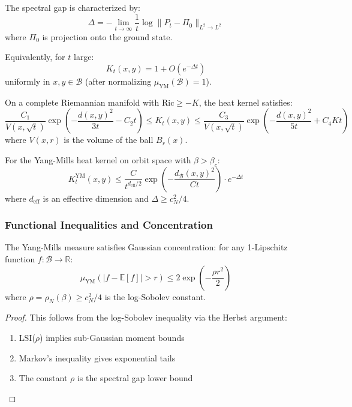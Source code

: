 \begin{theorem}
\label{thm:heat-kernel-gap}
The spectral gap is characterized by:
\[
\Delta = -\lim_{t \to \infty} \frac{1}{t} \log \|P_t - \Pi_0\|_{L^2 \to L^2}
\]
where $\Pi_0$ is projection onto the ground state.

Equivalently, for $t$ large:
\[
K_t(x, y) = 1 + O(e^{-\Delta t})
\]
uniformly in $x, y \in \mathcal{B}$ (after normalizing $\mu_{\text{YM}}(\mathcal{B}) = 1$).
\end{theorem}

\begin{theorem}
\label{thm:li-yau}
On a complete Riemannian manifold with $\text{Ric} \geq -K$, the heat kernel satisfies:
\[
\frac{C_1}{V(x, \sqrt{t})} \exp\left( -\frac{d(x,y)^2}{3t} - C_2 t \right) 
\leq K_t(x, y) 
\leq \frac{C_3}{V(x, \sqrt{t})} \exp\left( -\frac{d(x,y)^2}{5t} + C_4 Kt \right)
\]
where $V(x, r)$ is the volume of the ball $B_r(x)$.
\end{theorem}

\begin{theorem}
\label{thm:heat-kernel-ym}
For the Yang-Mills heat kernel on orbit space with $\beta > \beta_c$:
\[
K_t^{\text{YM}}(x, y) \leq \frac{C}{t^{d_{\text{eff}}/2}} \exp\left( -\frac{d_{\mathcal{B}}(x,y)^2}{Ct} \right) \cdot e^{-\Delta t}
\]
where $d_{\text{eff}}$ is an effective dimension and $\Delta \geq c_N^2/4$.
\end{theorem}

\subsubsection{Functional Inequalities and Concentration}

\begin{theorem}
\label{thm:gaussian-concentration}
The Yang-Mills measure satisfies Gaussian concentration: for any 1-Lipschitz 
function $f: \mathcal{B} \to \mathbb{R}$:
\[
\mu_{\text{YM}}\left( |f - \mathbb{E}[f]| > r \right) \leq 2 \exp\left( -\frac{\rho r^2}{2} \right)
\]
where $\rho = \rho_N(\beta) \geq c_N^2/4$ is the log-Sobolev constant.
\end{theorem}

\begin{proof}
This follows from the log-Sobolev inequality via the Herbst argument:
\begin{enumerate}
\item LSI($\rho$) implies sub-Gaussian moment bounds
\item Markov's inequality gives exponential tails
\item The constant $\rho$ is the spectral gap lower bound
\end{enumerate}
\end{proof}

